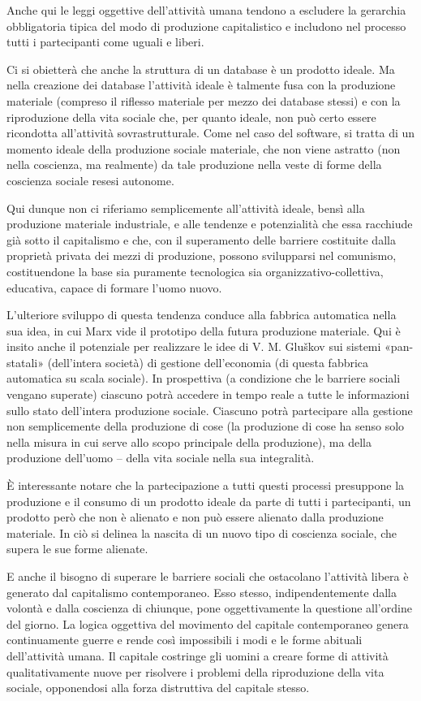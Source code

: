 \documentclass[12pt,a4paper,openany]{book}
\begin{document}
Anche qui le leggi oggettive dell'attività umana tendono a escludere la gerarchia obbligatoria tipica del modo di produzione capitalistico e includono nel processo tutti i partecipanti come uguali e liberi.

Ci si obietterà che anche la struttura di un database è un prodotto ideale. Ma nella creazione dei database l'attività ideale è talmente fusa con la produzione materiale (compreso il riflesso materiale per mezzo dei database stessi) e con la riproduzione della vita sociale che, per quanto ideale, non può certo essere ricondotta all'attività sovrastrutturale. Come nel caso del software, si tratta di un momento ideale della produzione sociale materiale, che non viene astratto (non nella coscienza, ma realmente) da tale produzione nella veste di forme della coscienza sociale resesi autonome.

Qui dunque non ci riferiamo semplicemente all'attività ideale, bensì alla produzione materiale industriale, e alle tendenze e potenzialità che essa racchiude già sotto il capitalismo e che, con il superamento delle barriere costituite dalla proprietà privata dei mezzi di produzione, possono svilupparsi nel comunismo, costituendone la base sia puramente tecnologica sia organizzativo-collettiva, educativa, capace di formare l'uomo nuovo.

L'ulteriore sviluppo di questa tendenza conduce alla fabbrica automatica nella sua idea, in cui Marx vide il prototipo della futura produzione materiale. Qui è insito anche il potenziale per realizzare le idee di V. M. Gluškov sui sistemi «pan-statali» (dell'intera società) di gestione dell'economia (di questa fabbrica automatica su scala sociale). In prospettiva (a condizione che le barriere sociali vengano superate) ciascuno potrà accedere in tempo reale a tutte le informazioni sullo stato dell'intera produzione sociale. Ciascuno potrà partecipare alla gestione non semplicemente della produzione di cose (la produzione di cose ha senso solo nella misura in cui serve allo scopo principale della produzione), ma della produzione dell'uomo – della vita sociale nella sua integralità.

È interessante notare che la partecipazione a tutti questi processi presuppone la produzione e il consumo di un prodotto ideale da parte di tutti i partecipanti, un prodotto però che non è alienato e non può essere alienato dalla produzione materiale. In ciò si delinea la nascita di un nuovo tipo di coscienza sociale, che supera le sue forme alienate.

E anche il bisogno di superare le barriere sociali che ostacolano l'attività libera è generato dal capitalismo contemporaneo. Esso stesso, indipendentemente dalla volontà e dalla coscienza di chiunque, pone oggettivamente la questione all'ordine del giorno. La logica oggettiva del movimento del capitale contemporaneo genera continuamente guerre e rende così impossibili i modi e le forme abituali dell'attività umana. Il capitale costringe gli uomini a creare forme di attività qualitativamente nuove per risolvere i problemi della riproduzione della vita sociale, opponendosi alla forza distruttiva del capitale stesso.
\ifSubfilesClassLoaded{\setcounter{page}{27}}{}
\end{document}
